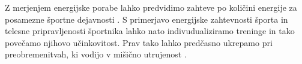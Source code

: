 Z merjenjem energijske porabe lahko predvidimo zahteve po količini energije za posamezne športne dejavnosti \cite{botton2011energy,osgnach2010energy}. S primerjavo energijske zahtevnosti športa in telesne pripravljenosti športnika lahko nato indivudualiziramo treninge in tako povečamo njihovo učinkovitost. Prav tako lahko predčasno ukrepamo pri preobremenitvah, ki vodijo v mišično utrujenost \cite{sahlin1998energy,reilly1997energetics}.







